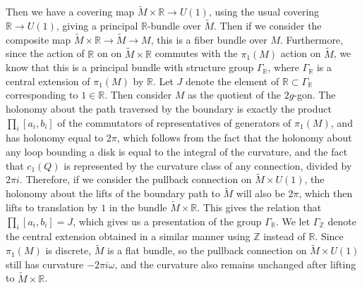 \documentclass[psamsfonts, 12pt]{amsart}
\theoremstyle{definition}
\theoremstyle{remark}
\newcommand{\R}{\mathbb{R}}
\newcommand{\Z}{\mathbb{Z}}
\begin{document}
%
Then we have a covering map $\widetilde{M} \times \R \to U(1)$, using the usual
covering $\R \to U(1)$, giving a principal $\R$-bundle over $\widetilde{M}$. Then
if we consider the composite map $\widetilde{M} \times \R \to \widetilde{M} \to M$,
this is a fiber bundle over $M$. Furthermore, since the action of $\R$
on on $\widetilde{M} \times \R$ commutes with the $\pi_1(M)$ action on $\widetilde{M}$,
we know that this is a principal bundle with structure group $\Gamma_\R$, where
$\Gamma_\R$ is a central extension of $\pi_1(M)$ by $\R$. Let $J$ denote the
element of $\R \subset \Gamma_\R$ corresponding to $1 \in \R$. Then consider
$M$ as the quotient of the $2g$-gon. The holonomy about the path traversed by
the boundary is exactly the product $\prod_i [a_i,b_i]$ of the commutators of
representatives of generators of $\pi_1(M)$, and has holonomy equal to $2\pi$, which
follows from the fact that the holonomy about any loop bounding a disk is equal to the
integral of the curvature, and the fact that $c_1(Q)$ is represented by
the curvature class of any connection, divided by $2\pi i$. Therefore, if we
consider the pullback connection on $\widetilde{M} \times U(1)$, the holonomy
about the lifts of the boundary path to $\widetilde{M}$ will also be $2\pi$,
which then lifts to translation by $1$ in the bundle $\widetilde{M} \times \R$.
This gives the relation that $\prod_i [a_i,b_i] = J$, which gives us a presentation
of the group $\Gamma_\R$. We let $\Gamma_\Z$ denote the central extension obtained
in a similar manner using $\Z$ instead of $\R$. Since $\pi_1(M)$ is discrete,
$\widetilde{M}$ is a flat bundle, so the pullback connection on
$\widetilde{M} \times U(1)$ still has curvature $-2\pi i \omega$, and the curvature
also remains unchanged after lifting to $\widetilde{M} \times \R$. \\
\end{document}
